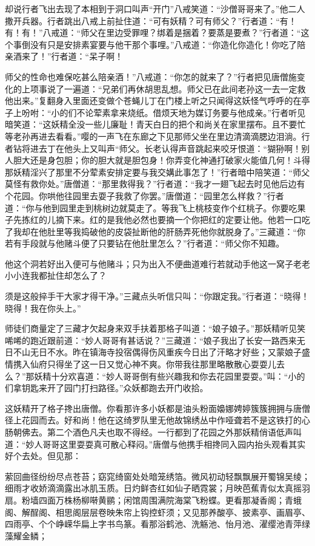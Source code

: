 \documentclass[12pt,UTF8]{ctexbook}
\begin{document}
{	却说行者飞出去现了本相到于洞口叫声“开门”八戒笑道：“沙僧哥哥来了。”他二人撒开兵器。行者跳出八戒上前扯住道：“可有妖精？可有师父？”行者道：“有！有！有！”八戒道：“师父在里边受罪哩？绑着是捆着？要蒸是要煮？”行者道：“这个事倒没有只是安排素宴要与他干那个事哩。”八戒道：“你造化你造化！你吃了陪亲酒来了！”行者道：“呆子啊！
	
	师父的性命也难保吃甚么陪亲酒！”八戒道：“你怎的就来了？”行者把见唐僧施变化的上项事说了一遍道：“兄弟们再休胡思乱想。师父已在此间老孙这一去一定救他出来。”复翻身入里面还变做个苍蝇儿丁在门楼上听之只闻得这妖怪气呼呼的在亭子上吩咐：“小的们不论荤素拿来烧纸。借烦天地为媒订务要与他成亲。”行者听见暗笑道：“这妖精全没一些儿廉耻！青天白日的把个和尚关在家里摆布。且不要忙等老孙再进去看看。”嘤的一声飞在东廊之下见那师父坐在里边清滴滴腮边泪淌。行者钻将进去丁在他头上又叫声“师父。长老认得声音跳起来咬牙恨道：“猢狲啊！别人胆大还是身包胆；你的胆大就是胆包身！你弄变化神通打破家火能值几何！斗得那妖精淫兴了那里不分荤素安排定要与我交媾此事怎了！”行者暗中陪笑道：“师父莫怪有救你处。”唐僧道：“那里救得我？”行者道：“我才一翅飞起去时见他后边有个花园。你哄他往园里去耍子我救了你罢。”唐僧道：“园里怎么样救？”行者道：“你与他到园里走到桃树边就莫走了。等我飞上桃枝变作个红桃子。你要吃果子先拣红的儿摘下来。红的是我他必然也要摘一个你把红的定要让他。他若一口吃了我却在他肚里等我捣破他的皮袋扯断他的肝肠弄死他你就脱身了。”三藏道：“你若有手段就与他赌斗便了只要钻在他肚里怎么？”行者道：“师父你不知趣。
	
	他这个洞若好出入便可与他赌斗；只为出入不便曲道难行若就动手他这一窝子老老小小连我都扯住却怎么了？
	
	须是这般捽手干大家才得干净。”三藏点头听信只叫：“你跟定我。”行者道：“晓得！晓得！我在你头上。”
	
	师徒们商量定了三藏才欠起身来双手扶着那格子叫道：“娘子娘子。”那妖精听见笑唏唏的跑近跟前道：“妙人哥哥有甚话说？”三藏道：“娘子我出了长安一路西来无日不山无日不水。昨在镇海寺投宿偶得伤风重疾今日出了汗略才好些；又蒙娘子盛情携入仙府只得坐了这一日又觉心神不爽。你带我往那里略散散心耍耍儿去么？”那妖精十分欢喜道：“妙人哥哥倒有些兴趣我和你去花园里耍耍。”叫：“小的们拿钥匙来开了园门打扫路径。”众妖都跑去开门收拾。
	
	这妖精开了格子搀出唐僧。你看那许多小妖都是油头粉面嬝娜娉婷簇簇拥拥与唐僧径上花园而去。好和尚！他在这绮罗队里无他故锦绣丛中作哑聋若不是这铁打的心肠朝佛去。第二个酒色凡夫也取不得经。一行都到了花园之外那妖精俏语低声叫道：“妙人哥哥这里耍耍真可散心释闷。”唐僧与他携手相搀同入园内抬头观看其实好个去处。但见那：
	
	萦回曲径纷纷尽点苍苔；窈窕绮窗处处暗笼绣箔。微风初动轻飘飘展开蜀锦吴绫；细雨才收娇滴滴露出冰肌玉质。日灼鲜杏红如仙子晒霓裳；月映芭蕉青似太真摇羽扇。粉墙四面万株杨柳啭黄鹂；闲馆周围满院海棠飞粉蝶。更看那凝香阁；青蛾阁、解酲阁、相思阁层层卷映朱帘上钩控虾须；又见那养酸亭、披素亭、画眉亭、四雨亭、个个峥嵘华扁上字书鸟篆。看那浴鹤池、洗觞池、怡月池、濯缨池青萍绿藻耀金鳞；
	
}
\end{document}
